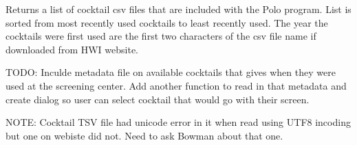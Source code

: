 \documentclass[letterpaper,10pt,english]{sphinxmanual}
\begin{document}
\begin{fulllineitems}
\label{\detokenize{polo.utils:polo.utils.io_utils.directory_validator}}
\end{fulllineitems}


\begin{fulllineitems}
\label{\detokenize{polo.utils:polo.utils.io_utils.export_run_to_csv}}
\end{fulllineitems}


\begin{fulllineitems}
\label{\detokenize{polo.utils:polo.utils.io_utils.get_available_cocktails}}
Returns a list of cocktail csv files that are included with the Polo
program. List is sorted from most recently used cocktails to least 
recently used. The year the cocktails were first used are the first two
characters of the csv file name if downloaded from HWI website.

TODO: Inculde metadata file on available cocktails that gives when they
were used at the screening center. Add another function to read in that
metadata and create dialog so user can select cocktail that would go with
their screen.

NOTE: Cocktail TSV file had unicode error in it when read using UTF\sphinxhyphen{}8
incoding but one on webiste did not. Need to ask Bowman about that one.

\end{fulllineitems}


\begin{fulllineitems}
\label{\detokenize{polo.utils:polo.utils.io_utils.get_cocktail_number_as_int}}
\end{fulllineitems}
\end{document}
